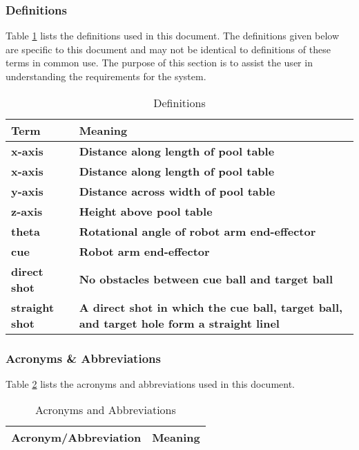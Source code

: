 \documentclass[titlepage]{article}
\begin{document}
\subsubsection{Definitions}
Table \ref{tab:Definitions} lists the definitions used in this document. The definitions given below are specific to this document and may not be identical to definitions of these terms in common use. The purpose of this section is to assist the user in understanding the requirements for the system.
\begin{table}[h!]
\centering
\caption{Definitions}
    \begin{tabular}{| p{6cm} | p{6cm} |}    \hline
    \textbf{Term} &\textbf{Meaning}\\ \hline
	\textbf{x-axis} &\textbf{Distance along length of pool table}\\ \hline
\textbf{x-axis} &\textbf{Distance along length of pool table}\\ \hline
\textbf{ y-axis} &\textbf{Distance across width of pool table}\\ \hline
\textbf{ z-axis} &\textbf{Height above pool table}\\ \hline
\textbf{ theta} &\textbf{Rotational angle of robot arm end-effector}\\ \hline
\textbf{cue} &\textbf{Robot arm end-effector}\\ \hline
\textbf{direct shot} &\textbf{No obstacles between cue ball and target ball}\\ \hline
\textbf{ straight shot} &\textbf{A direct shot in which the cue ball, target ball, and target hole form a straight linel}\\ \hline
    \end{tabular}
\label{tab:Definitions}
\end{table}

\subsubsection{Acronyms \& Abbreviations}
Table \ref{tab:Acronyms} lists the acronyms and abbreviations used in this document.
\begin{table}[h!]
\centering
\caption{Acronyms and Abbreviations}
    \begin{tabular}{| p{6cm} | p{6cm} |}    \hline
    \textbf{Acronym/Abbreviation} &\textbf{Meaning}\\ \hline
    \end{tabular}
\label{tab:Acronyms}
\end{table}
\end{document}
